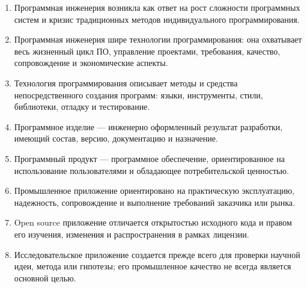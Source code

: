 \documentclass[12pt,a4paper]{article}
\begin{document}
\begin{enumerate}
    \item Программная инженерия возникла как ответ на рост сложности программных систем и кризис традиционных методов индивидуального программирования.

    \item Программная инженерия шире технологии программирования: она охватывает весь жизненный цикл ПО, управление проектами, требования, качество, сопровождение и экономические аспекты.

    \item Технология программирования описывает методы и средства непосредственного создания программ: языки, инструменты, стили, библиотеки, отладку и тестирование.

    \item Программное изделие --- инженерно оформленный результат разработки, имеющий состав, версию, документацию и назначение.

    \item Программный продукт --- программное обеспечение, ориентированное на использование пользователями и обладающее потребительской ценностью.

    \item Промышленное приложение ориентировано на практическую эксплуатацию, надежность, сопровождение и выполнение требований заказчика или рынка.

    \item Open source приложение отличается открытостью исходного кода и правом его изучения, изменения и распространения в рамках лицензии.

    \item Исследовательское приложение создается прежде всего для проверки научной идеи, метода или гипотезы; его промышленное качество не всегда является основной целью.
\end{enumerate}
\end{document}
